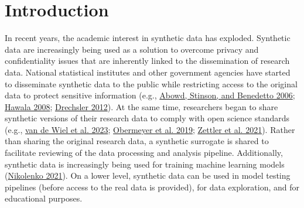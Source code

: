 \documentclass[
]{template/style/uneceart}
\author{}
\date{}
\begin{document}
\ifdefined\Shaded\renewenvironment{Shaded}{\begin{tcolorbox}[breakable, frame hidden, interior hidden, boxrule=0pt, sharp corners, borderline west={3pt}{0pt}{shadecolor}, enhanced]}{\end{tcolorbox}}\fi



\hypertarget{introduction}{%
\section{Introduction}\label{introduction}}

In recent years, the academic interest in synthetic data has exploded.
Synthetic data are increasingly being used as a solution to overcome
privacy and confidentiality issues that are inherently linked to the
dissemination of research data. National statistical institutes and
other government agencies have started to disseminate synthetic data to
the public while restricting access to the original data to protect
sensitive information (e.g.,
\protect\hyperlink{ref-SIPP_Beta_2006}{Abowd, Stinson, and Benedetto
2006}; \protect\hyperlink{ref-hawala_synthetic_2008}{Hawala 2008};
\protect\hyperlink{ref-drechsler2012}{Drechsler 2012}). At the same
time, researchers began to share synthetic versions of their research
data to comply with open science standards (e.g.,
\protect\hyperlink{ref-vandewiel2023}{van de Wiel et al. 2023};
\protect\hyperlink{ref-obermeyer2019}{Obermeyer et al. 2019};
\protect\hyperlink{ref-zettler2021}{Zettler et al. 2021}). Rather than
sharing the original research data, a synthetic surrogate is shared to
facilitate reviewing of the data processing and analysis pipeline.
Additionally, synthetic data is increasingly being used for training
machine learning models (\protect\hyperlink{ref-nikolenko2021}{Nikolenko
2021}). On a lower level, synthetic data can be used in model testing
pipelines (before access to the real data is provided), for data
exploration, and for educational purposes.
\end{document}
